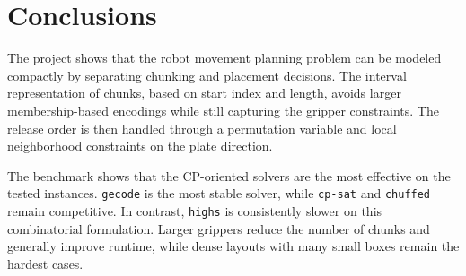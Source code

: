 \section{Conclusions}

The project shows that the robot movement planning problem can be modeled
compactly by separating chunking and placement decisions. The interval
representation of chunks, based on start index and length, avoids larger
membership-based encodings while still capturing the gripper constraints. The
release order is then handled through a permutation variable and local
neighborhood constraints on the plate direction.

The benchmark shows that the CP-oriented solvers are the most effective on the
tested instances. \texttt{gecode} is the most stable solver, while
\texttt{cp-sat} and \texttt{chuffed} remain competitive. In contrast,
\texttt{highs} is consistently slower on this combinatorial formulation. Larger
grippers reduce the number of chunks and generally improve runtime, while dense
layouts with many small boxes remain the hardest cases.